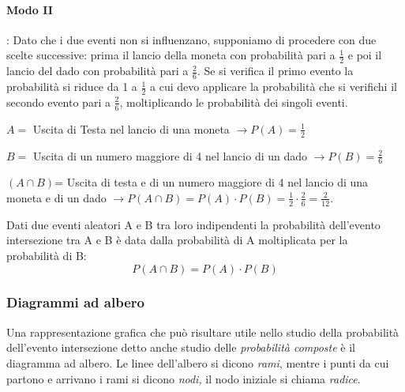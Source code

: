 \begin{esempio}
\begin{center}
 
\end{center}

\paragraph{Modo II}: Dato che i due eventi non si influenzano, supponiamo 
di 
procedere con due scelte successive: prima il lancio della moneta con 
probabilità pari a $\frac 1 2$ e poi il lancio del dado con probabilità 
pari a 
$\frac 2 6$. Se si verifica il primo evento la probabilità si riduce da 1 a 
$\frac 1 2$ a cui devo applicare la probabilità che si verifichi il secondo 
evento pari a $\frac 2 6$, moltiplicando le probabilità dei singoli eventi.
\begin{itemize*}
\item $ A = $ Uscita di Testa nel lancio di una moneta $\to P(A)=\frac 1 2$
\item $ B = $ Uscita di un numero maggiore di 4 nel lancio di un dado $\to 
P(B)=\frac 2 6$
\item $(A\cap B)$= Uscita di testa e di un numero maggiore di 4 nel lancio 
di 
una moneta e di un dado $\to P(A\cap B)=P(A)\cdot P(B)=\frac 1 2\cdot \frac 
2 
6=\frac 2{12}$.
\end{itemize*}
\end{esempio}

\begin{teorema}
Dati due eventi aleatori A e B tra loro indipendenti la 
probabilità dell'evento intersezione tra A e B è data dalla probabilità di 
A 
moltiplicata per la probabilità di B: \[P(A\cap B)=P(A)\cdot P(B)\]
\end{teorema}

\subsubsection*{Diagrammi ad albero}
Una rappresentazione grafica che può risultare utile nello studio della 
probabilità dell'evento intersezione detto anche studio delle 
\emph{probabilità composte} è il diagramma ad albero. Le linee dell'albero 
si dicono \emph{rami}, 
mentre i punti da cui partono e arrivano i rami si dicono \emph{nodi,} il 
nodo iniziale si chiama \emph{radice}.

